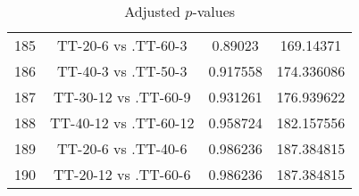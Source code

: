 \documentclass[a4paper,10pt]{article}
\begin{document}
\begin{landscape}
\begin{table}[!htp]
\begin{tabular}{cccc}
185&TT-20-6 vs .TT-60-3&0.89023&169.14371\\
186&TT-40-3 vs .TT-50-3&0.917558&174.336086\\
187&TT-30-12 vs .TT-60-9&0.931261&176.939622\\
188&TT-40-12 vs .TT-60-12&0.958724&182.157556\\
189&TT-20-6 vs .TT-40-6&0.986236&187.384815\\
190&TT-20-12 vs .TT-60-6&0.986236&187.384815\\
\hline
\end{tabular}
\caption{Adjusted $p$-values}
\end{table}

\end{landscape}
\end{document}
